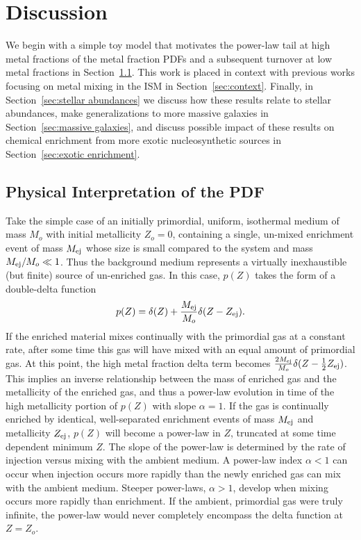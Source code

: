 \documentclass[twocolumn]{aastex61}
\begin{document}
\section{Discussion}
\label{sec:discussion}
We begin with a simple toy model that motivates the power-law tail at high metal fractions of the metal fraction PDFs and a subsequent turnover at low metal fractions in Section~\ref{sec:interpretation}. This work is placed in context with previous works focusing on metal mixing in the ISM in Section~\ref{sec:context}. Finally, in Section~\ref{sec:stellar abundances} we discuss how these results relate to stellar abundances, make generalizations to more massive galaxies in Section~\ref{sec:massive galaxies}, and discuss possible impact of these results on chemical enrichment from more exotic nucleosynthetic sources in Section~\ref{sec:exotic enrichment}.

\subsection{Physical Interpretation of the PDF}
\label{sec:interpretation}
Take the simple case of an initially primordial, uniform, isothermal medium of mass $M_o$ with initial metallicity $Z_o = 0$, containing a single, un-mixed enrichment event of mass $M_{\rm ej}$ whose size is small compared to the system and mass $M_{\rm ej} / M_o \ll 1$. Thus the background medium represents a virtually inexhaustible (but finite) source of un-enriched gas. In this case, $p(Z)$ takes the form of a double-delta function
\begin{equation}
p(Z) = \delta(Z) + \frac{M_{\rm ej}}{M_o}\delta(Z - Z_{\rm ej}).
\end{equation}
If the enriched material mixes continually with the primordial gas at a constant rate, after some time this gas will have mixed with an equal amount of primordial gas. At this point, the high metal fraction delta term becomes $\frac{2M_{\rm ej}}{M_o} \delta(Z - \frac{1}{2}Z_{\rm ej})$. This implies an inverse relationship between the mass of enriched gas and the metallicity of the enriched gas, and thus a power-law evolution in time of the high metallicity portion of $p(Z)$ with slope $\alpha = 1$. If the gas is continually enriched by identical, well-separated enrichment events of mass $M_{\rm ej}$ and metallicity $Z_{\rm ej}$, $p(Z)$ will become a power-law in $Z$, truncated at some time dependent minimum $Z$. The slope of the power-law is determined by the rate of injection versus mixing with the ambient medium. A power-law index $\alpha < 1$ can occur when injection occurs more rapidly than the newly enriched gas can mix with the ambient medium. Steeper power-laws, $\alpha > 1$, develop when mixing occurs more rapidly than enrichment. If the ambient, primordial gas were truly infinite, the power-law would never completely encompass the delta function at $Z = Z_o$.
\end{document}
